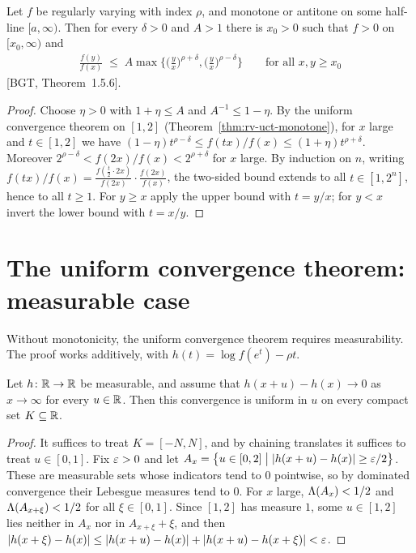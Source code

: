 \begin{theorem}
  \label{thm:rv-potter-monotone}
  \leanok
  Let $f$ be regularly varying with index $\rho$, and monotone or antitone on some
  half-line $[a,\infty)$. Then for every $\delta > 0$ and $A > 1$ there is $x_0 > 0$
  such that $f > 0$ on $[x_0, \infty)$ and
  \begin{align*}
    \frac{f(y)}{f(x)} \; \le \; A \max\Big\{ \Big(\frac{y}{x}\Big)^{\rho+\delta},
      \Big(\frac{y}{x}\Big)^{\rho-\delta} \Big\}
    \qquad \text{for all } x, y \ge x_0
  \end{align*}
  [BGT, Theorem~1.5.6].
\end{theorem}
\begin{proof}
  \leanok
  Choose $\eta > 0$ with $1 + \eta \le A$ and $A^{-1} \le 1 - \eta$. By the uniform
  convergence theorem on $[1,2]$ (Theorem~\ref{thm:rv-uct-monotone}), for $x$ large and
  $t \in [1,2]$ we have
  $(1-\eta) t^{\rho - \delta} \le f(tx)/f(x) \le (1+\eta) t^{\rho+\delta}$.
  Moreover $2^{\rho - \delta} < f(2x)/f(x) < 2^{\rho+\delta}$ for $x$ large.
  By induction on $n$, writing $f(tx)/f(x) = \frac{f(\frac{t}{2} \cdot 2x)}{f(2x)} \cdot \frac{f(2x)}{f(x)}$,
  the two-sided bound extends to all $t \in [1, 2^n]$, hence to all $t \ge 1$.
  For $y \ge x$ apply the upper bound with $t = y/x$; for $y < x$ invert the lower bound
  with $t = x/y$.
\end{proof}


\section{The uniform convergence theorem: measurable case}

Without monotonicity, the uniform convergence theorem requires measurability. The proof
works additively, with $h(t) = \log f(e^t) - \rho t$.

\begin{theorem}
  \label{thm:uct-additive}
  \leanok
  Let $h \colon \mathbb{R} \to \mathbb{R}$ be measurable, and assume that $h(x+u) - h(x) \to 0$ as
  $x \to \infty$ for every $u \in \mathbb{R}$. Then this convergence is uniform in $u$ on
  every compact set $K \subseteq \mathbb{R}$.
\end{theorem}
\begin{proof}
  \leanok
  It suffices to treat $K = [-N, N]$, and by chaining translates it suffices to treat
  $u \in [0,1]$. Fix $\varepsilon > 0$ and let
  $A_x = \left\{  u \in [0,2] \; \big| \; |h(x+u) - h(x)| \ge \varepsilon/2  \right\}$. These are measurable
  sets whose indicators tend to $0$ pointwise, so by dominated convergence their Lebesgue
  measures tend to $0$. For $x$ large, $\Lambda(A_x) < 1/2$ and $\Lambda(A_{x+\xi}) < 1/2$ for all
  $\xi \in [0,1]$. Since $[1,2]$ has measure $1$, some $u \in [1,2]$ lies neither in $A_x$ nor
  in $A_{x+\xi} + \xi$, and then
  $|h(x+\xi) - h(x)| \le |h(x+u) - h(x)| + |h(x+u) - h(x+\xi)| < \varepsilon$.
\end{proof}

